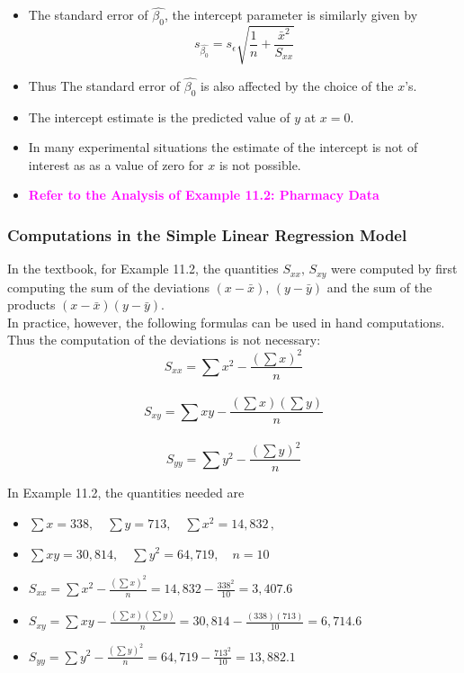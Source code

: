\documentclass[xcolor=dvipsnames,12pt]{beamer}
\begin{document}
\begin{frame}
\begin{itemize}
\item The standard error of $\hat{\beta_0}$, the intercept parameter
is similarly given by 
$$ s_{\hat{\beta_0}}= s_{\epsilon}\sqrt{\frac1n + \frac{\bar{x}^2}{S_{xx}}}$$
\item Thus The standard error of $\hat{\beta_0}$ is also affected by the choice of the $x$'s.
\item  The intercept estimate is the predicted value of $y$ at $x=0$.
\item In many experimental situations the estimate of the intercept is not of interest as 
as a value of zero for $x$ is not possible. 
\item \textbf{\textcolor{magenta}{Refer to the Analysis of Example 11.2: Pharmacy Data}}
\end{itemize}
\end{frame}



\begin{frame}
\frametitle{Computations in the Simple Linear Regression Model}
 In the textbook, for Example 11.2, the quantities $S_{xx},\,S_{xy}$ were computed
by first computing the sum of the deviations $(x-\bar{x}),\, (y-\bar{y})$ and the sum of the products $(x-\bar{x})(y-\bar{y})$.\\
 In practice,
however, the following formulas can be used in hand computations. 
Thus the computation of the deviations is not necessary:
$$S_{xx} = \sum x^2 - \frac{(\sum x)^2}{n}$$\\
$$S_{xy} = \sum xy - \frac{(\sum x)(\sum y)}{n}$$\\
$$S_{yy} = \sum y^2 - \frac{(\sum y)^2}{n}$$
\end{frame}




\begin{frame}
 In Example 11.2, the quantities needed are
 \begin{itemize}
\item  $ \sum x = 338,\quad \sum y =713 ,\quad \sum x^2=14,832\, , $
\item $\sum xy=30,814,\quad \sum y^2=64,719, \quad n=10$
\item $S_{xx} = \sum x^2 - \frac{(\sum x)^2}{n}=14,832-\frac{338^2}{10}=3,407.6$
\item $S_{xy} = \sum xy - \frac{(\sum x)(\sum y)}{n}
            =30,814-\frac{(338)(713)}{10}=6,714.6$
\item $S_{yy} = \sum y^2 - \frac{(\sum y)^2}{n}=64,719-\frac{713^2}{10}=13,882.1$
\end{itemize}
\end{frame}
\end{document}

